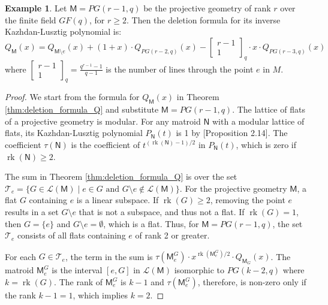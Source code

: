 \documentclass[11pt, a4paper, english]{amsart}
\theoremstyle{teoremas}
\theoremstyle{definition}
\newtheorem{example}[theorem]{Example}
\DeclareMathOperator{\rk}{rk}
\newcommand{\M}{\mathsf{M}}
\newcommand{\N}{\mathsf{N}}
\newcommand{\rank}{\operatorname{rk}}
\newcommand{\cL}{\mathcal{L}}
\newcommand{\qbinom}[2]{\begin{bmatrix} #1 \\ #2 \end{bmatrix}_q}
\begin{document}
\begin{example}
    Let $\M = PG(r-1, q)$ be the projective geometry of rank $r$ over the finite field $GF(q)$, for $r \geq 2$. Then the deletion formula for its inverse Kazhdan-Lusztig polynomial is:
    \[
        Q_{\M}(x) = Q_{\M\setminus e}(x) + (1 + x)\cdot Q_{PG(r-2,q)}(x) - \qbinom{r-1}{1} \cdot x \cdot Q_{PG(r-3,q)}(x)
    \]
    where $\qbinom{r-1}{1} = \frac{q^{r-1}-1}{q-1}$ is the number of lines through the point $e$ in $M$.
\end{example}
\begin{proof}
    We start from the formula for $Q_{\M}(x)$ in Theorem \ref{thm:deletion_formula_Q} and substitute $\M = PG(r-1, q)$.
    The lattice of flats of a projective geometry is modular. For any matroid $\N$ with a modular lattice of flats,
    its Kazhdan-Lusztig polynomial $P_{\N}(t)$ is 1 by \cite{EPW16}[Proposition 2.14].
    The coefficient $\tau(\N)$ is the coefficient of $t^{(\rank(\N)-1)/2}$ in $P_{\N}(t)$, which is zero if $\rank(\N) \geq 2$.

    The sum in Theorem \ref{thm:deletion_formula_Q} is over the set
    $\mathscr{T}_e = \{G \in \cL(\M) \mid e \in G \text{ and } G\setminus e \notin \mathcal{L}(\M)\}$.
    For the projective geometry $\M$, a flat $G$ containing $e$ is a linear subspace. If $\rank(G) \geq 2$, removing the point $e$ results in a set $G\setminus e$ that is not a subspace, and thus not a flat. If $\rank(G)=1$, then $G=\{e\}$ and $G\setminus e = \emptyset$, which is a flat. Thus, for $\M=PG(r-1,q)$, the set $\mathscr{T}_e$ consists of all flats containing $e$ of rank 2 or greater.

    For each $G \in \mathscr{T}_e$, the term in the sum is $\tau(\M^G_e)\cdot x^{\rk(\M^G_e)/2} \cdot Q_{\M_G}(x)$.
    The matroid $\M^G_e$ is the interval $[e, G]$ in $\cL(\M)$ isomorphic to $PG(k-2,q)$ where $k=\rk(G)$.
    The rank of $\M^G_e$ is $k-1$ and $\tau(\M^G_e)$, therefore, is non-zero only if the rank $k-1=1$, which implies $k=2$.


\end{proof}
\end{document}
